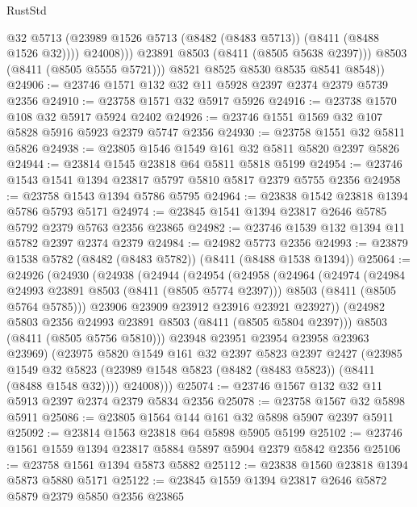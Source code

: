 \begin{lexlean}{RustStd}
\begin{coremodule}
                    @32
                    @5713
                    (@23989 @1526 @5713 (@8482 (@8483 @5713)) (@8411 (@8488 @1526 @32))))
                  @24008)))
            @23891
            @8503
            (@8411 (@8505 @5638 @2397)))
          @8503
          (@8411 (@8505 @5555 @5721)))
        @8521
        @8525
        @8530
        @8535
        @8541
        @8548))
@24906 := @23746 @1571 @132 @32 @11 @5928 @2397 @2374 @2379 @5739 @2356
@24910 := @23758 @1571 @32 @5917 @5926
@24916 := @23738 @1570 @108 @32 @5917 @5924 @2402
@24926 := @23746 @1551 @1569 @32 @107 @5828 @5916 @5923 @2379 @5747 @2356
@24930 := @23758 @1551 @32 @5811 @5826
@24938 := @23805 @1546 @1549 @161 @32 @5811 @5820 @2397 @5826
@24944 := @23814 @1545 @23818 @64 @5811 @5818 @5199
@24954 := @23746 @1543 @1541 @1394 @23817 @5797 @5810 @5817 @2379 @5755 @2356
@24958 := @23758 @1543 @1394 @5786 @5795
@24964 := @23838 @1542 @23818 @1394 @5786 @5793 @5171
@24974 := @23845 @1541 @1394 @23817 @2646 @5785 @5792 @2379 @5763 @2356 @23865
@24982 := @23746 @1539 @132 @1394 @11 @5782 @2397 @2374 @2379
@24984 := @24982 @5773 @2356
@24993 := @23879 @1538 @5782 (@8482 (@8483 @5782)) (@8411 (@8488 @1538 @1394))
@25064 := @24926
    (@24930
      (@24938
        (@24944
          (@24954
            (@24958
              (@24964
                (@24974
                  (@24984 @24993 @23891 @8503 (@8411 (@8505 @5774 @2397)))
                  @8503
                  (@8411 (@8505 @5764 @5785)))
                @23906
                @23909
                @23912
                @23916
                @23921
                @23927))
            (@24982 @5803 @2356 @24993 @23891 @8503 (@8411 (@8505 @5804 @2397)))
            @8503
            (@8411 (@8505 @5756 @5810)))
          @23948
          @23951
          @23954
          @23958
          @23963
          @23969)
        (@23975
          @5820
          @1549
          @161
          @32
          @2397
          @5823
          @2397
          @2427
          (@23985
            @1549
            @32
            @5823
            (@23989 @1548 @5823 (@8482 (@8483 @5823)) (@8411 (@8488 @1548 @32))))
          @24008)))
@25074 := @23746 @1567 @132 @32 @11 @5913 @2397 @2374 @2379 @5834 @2356
@25078 := @23758 @1567 @32 @5898 @5911
@25086 := @23805 @1564 @144 @161 @32 @5898 @5907 @2397 @5911
@25092 := @23814 @1563 @23818 @64 @5898 @5905 @5199
@25102 := @23746 @1561 @1559 @1394 @23817 @5884 @5897 @5904 @2379 @5842 @2356
@25106 := @23758 @1561 @1394 @5873 @5882
@25112 := @23838 @1560 @23818 @1394 @5873 @5880 @5171
@25122 := @23845 @1559 @1394 @23817 @2646 @5872 @5879 @2379 @5850 @2356 @23865

\end{coremodule}
\end{lexlean}
